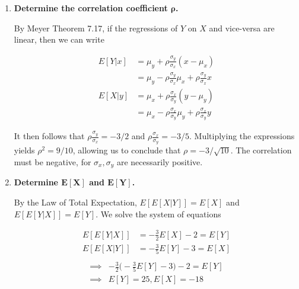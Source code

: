 \documentclass[10pt, oneside]{article}
\begin{document}
\begin{enumerate}[label=7.\arabic*]
	\begin{enumerate}
	\item  \begin{tcolorbox}[
	  colback=Cerulean!5!white,
	  colframe=Cerulean!75!black]
	  \textbf{Determine the correlation coefficient $\bm{\rho}$.}
	  \end{tcolorbox}
	  
	  By Meyer Theorem 7.17, if the regressions of $Y$ on $X$ and vice-versa are linear, then we can write
	  
	  \begin{align*}
	  E[Y | x] &= \mu_y + \rho \frac{\sigma_y}{\sigma_x} (x - \mu_x) \\
	  &= \mu_y - \rho \frac{\sigma_y}{\sigma_x} \mu_x + \rho \frac{\sigma_y}{\sigma_x} x \\
	  E[X | y] &= \mu_x + \rho \frac{\sigma_x}{\sigma_y} (y - \mu_y) \\
	  &= \mu_x - \rho \frac{\sigma_x}{\sigma_y} \mu_y + \rho \frac{\sigma_x}{\sigma_y} y
	  \end{align*}
	  
	  It then follows that $\rho \frac{\sigma_y}{\sigma_x} = -3/2$ and $\rho \frac{\sigma_x}{\sigma_y} = -3/5$. Multiplying the expressions yields $\rho^2 = 9/10$, allowing us to conclude that $\boxed{ \rho = -3 / \sqrt{10} }$. The correlation must be negative, for $\sigma_x, \sigma_y$ are necessarily positive.
	  
	\item  \begin{tcolorbox}[
	  colback=Cerulean!5!white,
	  colframe=Cerulean!75!black]
	  \textbf{Determine $\bm{E[X]}$ and $\bm{E[Y]}$.}
	  \end{tcolorbox}
	  
	  By the Law of Total Expectation, $E[E[X | Y]] = E[X]$ and $E[E[Y | X]] = E[Y]$. We solve the system of equations
	  
	  \begin{align*}
	  E[E[Y | X]] &= -\frac{3}{2} E[X] - 2 = E[Y] \\
	  E[E[X | Y]] &= -\frac{3}{5} E[Y] - 3 = E[X] \\
	  \end{align*}
	  \begin{align*}
	  \implies &-\frac{3}{2} \Big( -\frac{3}{5} E[Y] - 3 \Big) - 2 = E[Y] \\
	  \implies &\boxed{E[Y] = 25, E[X] = -18}
	  \end{align*}
	  

\end{enumerate}
\end{enumerate}
\end{document}
